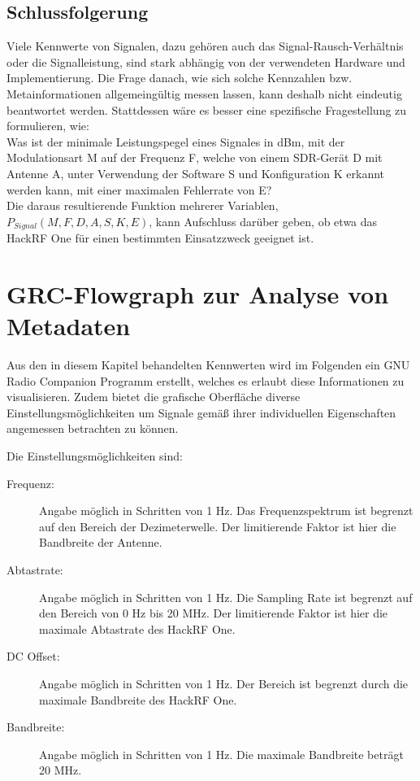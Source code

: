 \subsection{Schlussfolgerung}
Viele Kennwerte von Signalen, dazu gehören auch das Signal-Rausch-Verhältnis oder die Signalleistung, sind stark abhängig von der verwendeten Hardware und Implementierung.
Die Frage danach, wie sich solche Kennzahlen bzw. Metainformationen allgemeingültig messen lassen, kann deshalb nicht eindeutig beantwortet werden.
Stattdessen wäre es besser eine spezifische Fragestellung zu formulieren, wie: \\
Was ist der minimale Leistungspegel eines Signales in dBm, mit der Modulationsart M auf der Frequenz F, welche von einem SDR-Gerät D mit Antenne A, unter Verwendung der Software S und Konfiguration K erkannt werden kann, mit einer maximalen Fehlerrate von E?\\
Die daraus resultierende Funktion mehrerer Variablen, \(P_{Signal} (M, F, D, A, S, K, E)\), kann Aufschluss darüber geben, ob etwa das HackRF One für einen bestimmten Einsatzzweck geeignet ist.

\newpage
\section{GRC-Flowgraph zur Analyse von Metadaten}
Aus den in diesem Kapitel behandelten Kennwerten wird im Folgenden ein GNU Radio Companion Programm erstellt, welches es erlaubt diese Informationen zu visualisieren. Zudem bietet die grafische Oberfläche diverse Einstellungsmöglichkeiten um Signale gemäß ihrer individuellen Eigenschaften angemessen betrachten zu können.

Die Einstellungsmöglichkeiten sind:

\begin{description}
	\item [Frequenz:] Angabe möglich in Schritten von 1 Hz. Das Frequenzspektrum ist begrenzt auf den Bereich der Dezimeterwelle. Der limitierende Faktor ist hier die Bandbreite der Antenne.
	\item [Abtastrate:] Angabe möglich in Schritten von 1 Hz. Die Sampling Rate ist begrenzt auf den Bereich von 0 Hz bis 20 MHz. Der limitierende Faktor ist hier die maximale Abtastrate des HackRF One.
	\item [DC Offset:]  Angabe möglich in Schritten von 1 Hz. Der Bereich ist begrenzt durch die maximale Bandbreite des HackRF One.
	\item[Bandbreite:] Angabe möglich in Schritten von 1 Hz. Die maximale Bandbreite beträgt 20 MHz. 
\end{description}

